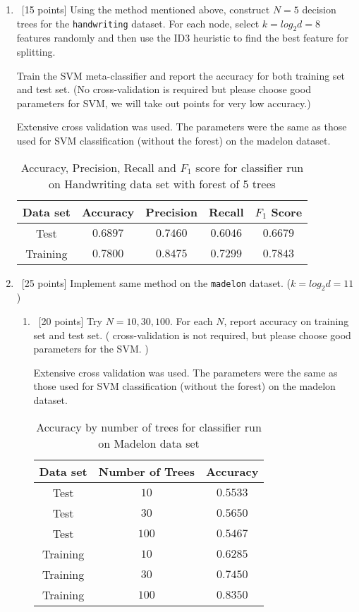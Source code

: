 \begin{enumerate}
\item ~[15 points] Using the method mentioned above, construct
  $N = 5$ decision trees for the {\tt handwriting} dataset. For each
  node, select $k = log_2 d = 8$ features randomly and then use the
  ID3 heuristic to find the best feature for splitting.

  Train the SVM meta-classifier and report the accuracy for both
  training set and test set. (No cross-validation is required but
  please choose good parameters for SVM, we will take out points for
  very low accuracy.)
  
  Extensive cross validation was used. The parameters were the same as those used for SVM classification (without the forest) on the madelon dataset.
      \begin{table}[H]
    \centering
    \begin{tabular}{| c | c | c | c | c |}
      \hline
      Data set & Accuracy & Precision & Recall & $F_1$ Score  \\
      \hline
      Test& $0.6897$ & $0.7460$& $0.6046$& $0.6679$\\
      \hline
      Training& $0.7800$ & $0.8475$& $0.7299$& $0.7843$\\
      \hline
   \end{tabular}
    \caption{Accuracy, Precision, Recall and $F_1$ score for classifier run on Handwriting data set with forest of 5 trees}
  \end{table}   


\item ~[25 points] Implement same method on the {\tt madelon}
  dataset. ($k = log_2 d = 11$)
  \begin{enumerate}
  \item ~[20 points] Try $N = 10, 30, 100$. For each $N$, report
    accuracy on training set and test set. ( cross-validation is not
   required, but please choose good parameters for the SVM. )

  Extensive cross validation was used. The parameters were the same as those used for SVM classification (without the forest) on the madelon dataset.
  
      \begin{table}[H]
    \centering
    \begin{tabular}{| c | c | c |}
      \hline
      Data set & Number of Trees & Accuracy \\
      \hline
      Test& $10$ & $0.5533$\\
      \hline
      Test& $30$ & $0.5650$\\
      \hline
      Test& $100$ & $0.5467$\\
      \hline
      Training& $10$ & $0.6285$\\
      \hline
      Training& $30$ & $0.7450$\\
      \hline
      Training& $100$ & $0.8350$\\
      \hline
   \end{tabular}
    \caption{Accuracy by number of trees for classifier run on Madelon data set}
  \end{table}   



\end{enumerate}
\end{enumerate}
